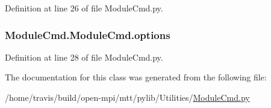 Definition at line 26 of file Module\-Cmd.\-py.

\hypertarget{class_module_cmd_1_1_module_cmd_a981a0fc879a722b76faa16b4289ab953}{
\subsubsection[{options}]{\setlength{\rightskip}{0pt plus 5cm}Module\-Cmd.\-Module\-Cmd.\-options}}\label{class_module_cmd_1_1_module_cmd_a981a0fc879a722b76faa16b4289ab953}


Definition at line 28 of file Module\-Cmd.\-py.



The documentation for this class was generated from the following file\-:\begin{DoxyCompactItemize}
\item 
/home/travis/build/open-\/mpi/mtt/pylib/\-Utilities/\hyperlink{_module_cmd_8py}{Module\-Cmd.\-py}\end{DoxyCompactItemize}
